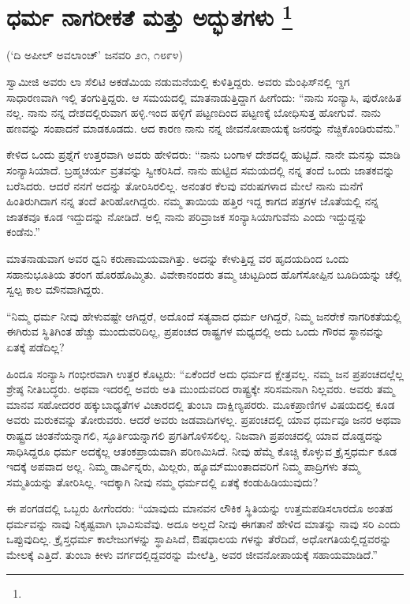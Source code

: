 
\chapter[ಧರ್ಮ ನಾಗರೀಕತೆ ಮತ್ತು ಅದ್ಭುತಗಳು ]{ಧರ್ಮ ನಾಗರೀಕತೆ ಮತ್ತು ಅದ್ಭುತಗಳು \protect\footnote{}}

\centerline{(‘ದಿ ಅಪೀಲ್​ ಅವಲಾಂಚ್​’ ಜನವರಿ ೨೧, ೧೮೯೪)}

ಸ್ವಾಮೀಜಿ ಅವರು ಲಾ ಸೆಲಿಟಿ ಅಕಡೆಮಿಯ ನಡುಮನೆಯಲ್ಲಿ ಕುಳಿತ್ತಿದ್ದರು. ಅವರು ಮೆಂಫಿಸ್​ನಲ್ಲಿ ಇ್ದಗ ಸಾಧಾರಣವಾಗಿ ಇಲ್ಲಿ ತಂಗುತ್ತಿದ್ದರು. ಆ ಸಮಯದಲ್ಲಿ ಮಾತನಾಡುತ್ತಿದ್ದಾಗ ಹೀಗೆಂದು: “ನಾನು ಸಂನ್ಯಾಸಿ, ಪುರೋಹಿತ ನಲ್ಲ. ನಾನು ನನ್ನ ದೇಶದಲ್ಲಿರುವಾಗ ಹಳ್ಳಿ.ಇಂದ ಹಳ್ಳಿಗೆ ಪಟ್ಟಣದಿಂದ ಪಟ್ಟಣಕ್ಕೆ ಬೋಧಿಸುತ್ತ ಹೋಗುವೆ. ನಾನು ಹಣವನ್ನು ಸಂಪಾದನೆ ಮಾಡಕೂಡದು. ಆದ ಕಾರಣ ನಾನು ನನ್ನ ಜೀವನೋಪಾಯಕ್ಕೆ ಜನರನ್ನು ನೆಚ್ಚಿಕೊಂಡಿರುವೆನು.”

ಕೇಳಿದ ಒಂದು ಪ್ರಶ್ನೆಗೆ ಉತ್ತರವಾಗಿ ಅವರು ಹೇಳಿದರು: “ನಾನು ಬಂಗಾಳ ದೇಶದಲ್ಲಿ ಹುಟ್ಟಿದೆ. ನಾನೇ ಮನಸ್ಸು ಮಾಡಿ ಸಂನ್ಯಾಸಿಯಾದೆ. ಬ್ರಹ್ಮಚರ್ಯ ವ್ರತವನ್ನು ಸ್ವೀಕರಿಸಿದೆ. ನಾನು ಹುಟ್ಟಿದ ಸಮಯದಲ್ಲಿ ನನ್ನ ತಂದೆ ಒಂದು ಜಾತಕವನ್ನು ಬರೆಸಿದರು. ಆದರೆ ನನಗೆ ಅದನ್ನು ತೋರಿಸಿರಲಿಲ್ಲ. ಅನಂತರ ಕೆಲವು ವರುಷಗಳಾದ ಮೇಲೆ ನಾನು ಮನೆಗೆ ಹಿಂತಿರುಗಿದಾಗ ನನ್ನ ತಂದೆ ತೀರಿಹೋಗಿದ್ದರು. ನಮ್ಮ ತಾಯಿಯ ಹತ್ತಿರ ಇದ್ದ ಕಾಗದ ಪತ್ರಗಳ ಜೊತೆಯಲ್ಲಿ ನನ್ನ ಜಾತಕವೂ ಕೂಡ ಇದ್ದುದನ್ನು ನೋಡಿದೆ. ಅಲ್ಲಿ ನಾನು ಪರಿವ್ರಾಜಕ ಸಂನ್ಯಾಸಿಯಾಗುವೆನು ಎಂದು ಇದ್ದುದ್ದನ್ನು ಕಂಡೆನು.”

ಮಾತನಾಡುವಾಗ ಅವರ ಧ್ವನಿ ಕರುಣಾಮಯವಾಗಿತ್ತು. ಅದನ್ನು ಕೇಳುತ್ತಿದ್ದ ವರ ಹೃದಯದಿಂದ ಒಂದು ಸಹಾನುಭೂತಿಯ ತರಂಗ ಹೊರಹೊಮ್ಮಿತು. ವಿವೇಕಾನಂದರು ತಮ್ಮ ಚುಟ್ಟದಿಂದ ಹೊಗೆಸೋಪ್ಪಿನ ಬೂದಿಯನ್ನು ಚೆಲ್ಲಿ ಸ್ವಲ್ಪ ಕಾಲ ಮೌನವಾಗಿದ್ದರು.

“ನಿಮ್ಮ ಧರ್ಮ ನೀವು ಹೇಳುವಷ್ಟೇ ಆಗಿದ್ದರೆ, ಅದೊಂದೆ ಸತ್ಯವಾದ ಧರ್ಮ ಆಗಿದ್ದರೆ, ನಿಮ್ಮ ಜನರೇಕೆ ನಾಗರಿಕತೆಯಲ್ಲಿ ಈಗಿರುವ ಸ್ಥಿತಿಗಿಂತ ಹೆಚ್ಚು ಮುಂದುವರಿದಿಲ್ಲ, ಪ್ರಪಂಚದ ರಾಷ್ಟ್ರಗಳ ಮಧ್ಯದಲ್ಲಿ ಅದು ಒಂದು ಗೌರವ ಸ್ಥಾನವನ್ನು ಏತಕ್ಕೆ ಪಡೆದಿಲ್ಲ?

ಹಿಂದೂ ಸಂನ್ಯಾಸಿ ಗಂಭೀರವಾಗಿ ಉತ್ತರ ಕೊಟ್ಟರು: “ಏಕೆಂದರೆ ಅದು ಧರ್ಮದ ಕ್ಷೇತ್ರವಲ್ಲ. ನಮ್ಮ ಜನ ಪ್ರಪಂಚದಲ್ಲೆಲ್ಲ ಶ್ರೇಷ್ಠ ನೀತಿಬದ್ಧರು. ಅಥವಾ ಇದರಲ್ಲಿ ಅವರು ಅತಿ ಮುಂದುವರಿದ ರಾಷ್ಟ್ರಕ್ಕೇ ಸರಿಸಮನಾಗಿ ನಿಲ್ಲವರು. ಅವರು ತಮ್ಮ ಮಾನವ ಸಹೋದರರ ಹಕ್ಕುಬಾಧ್ಯತೆಗಳ ವಿಚಾರದಲ್ಲಿ ತುಂಬಾ ದಾಕ್ಷಿಣ್ಯಪರರು. ಮೂಕಪ್ರಾಣಿಗಳ ವಿಷಯದಲ್ಲಿ ಕೂಡ ಅವರು ಮರುಕವನ್ನು ತೋರುವರು. ಆದರೆ ಅವರು ಜಡವಾದಿಗಳಲ್ಲ. ಪ್ರಪಂಚದಲ್ಲಿ ಯಾವ ಧರ್ಮವೂ ಜನರ ಅಥವಾ ರಾಷ್ಟ್ರದ ಚಿಂತನೆಯನ್ನಾಗಲಿ, ಸ್ಫೂರ್ತಿಯನ್ನಾಗಲಿ ಪ್ರಗತಿಗೊಳಿಸಲಿಲ್ಲ. ನಿಜವಾಗಿ ಪ್ರಪಂಚದಲ್ಲಿ ಯಾವ ದೊಡ್ಡದನ್ನು ಸಾಧಿಸಿದ್ದರೂ ಧರ್ಮ ಅದಕ್ಕೆಲ್ಲ ಆತಂಕಪ್ರಾಯವಾಗಿ ಪರಿಣಮಿಸಿದೆ. ನೀವು ಹೆಮ್ಮೆ ಕೊಚ್ಚಿ ಕೊಳ್ಳುವ ಕ್ರೈಸ್ತಧರ್ಮ ಕೂಡ ಇದಕ್ಕೆ ಅಪವಾದ ಅಲ್ಲ. ನಿಮ್ಮ ಡಾರ್ವಿನ್ನರು, ಮಿಲ್ಲರು, ಹ್ಯೂಮ್​ ಮುಂತಾದವರಿಗೆ ನಿಮ್ಮ ಪಾದ್ರಿಗಳು ತಮ್ಮ ಸಮ್ಮತಿಯನ್ನು ತೋರಿಸಿಲ್ಲ. ಇದಕ್ಕಾಗಿ ನೀವು ನಮ್ಮ ಧರ್ಮದಲ್ಲಿ ಏತಕ್ಕೆ ಕಂಡುಹಿಡಿಯುವುದು?

ಈ ಪಂಗಡದಲ್ಲಿ ಒಬ್ಬರು ಹೀಗೆಂದರು: “ಯಾವುದು ಮಾನವನ ಲೌಕಿಕ ಸ್ಥಿತಿಯನ್ನು ಉತ್ತಮಪಡಿಸಲಾರದೊ ಅಂತಹ ಧರ್ಮವನ್ನು ನಾವು ನಿಕೃಷ್ಟವಾಗಿ ಭಾವಿಸುವೆವು. ಅದೂ ಅಲ್ಲದೆ ನೀವು ಈಗತಾನೆ ಹೇಳಿದ ಮಾತನ್ನು ನಾವು ಸರಿ ಎಂದು ಒಪ್ಪುವುದಿಲ್ಲ. ಕ್ರೈಸ್ತಧರ್ಮ ಕಾಲೇಜುಗಳನ್ನು ಸ್ಥಾಪಿಸಿದೆ, ಔಷಧಾಲಯ ಗಳನ್ನು ತೆರೆದಿದೆ, ಅಧೋಗತಿಯಲ್ಲಿದ್ದವರನ್ನು ಮೇಲಕ್ಕೆ ಎತ್ತಿದೆ. ತುಂಬಾ ಕೀಳು ವರ್ಗದಲ್ಲಿದ್ದವರನ್ನು ಮೇಲೆತ್ತಿ, ಅವರ ಜೀವನೋಪಾಯಕ್ಕೆ ಸಹಾಯಮಾಡಿದೆ.”

